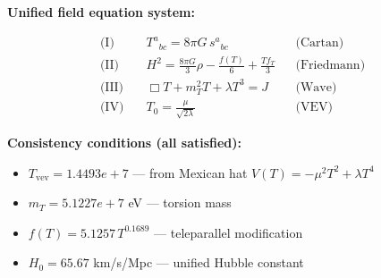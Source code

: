 
\textbf{Unified field equation system:}

\begin{align}
  \text{(I)} \quad & T^a{}_{bc} = 8\pi G \, s^a{}_{bc} && \text{(Cartan)} \\
  \text{(II)} \quad & H^2 = \frac{8\pi G}{3}\rho - \frac{f(T)}{6} + \frac{Tf_T}{3} && \text{(Friedmann)} \\
  \text{(III)} \quad & \Box T + m_T^2 T + \lambda T^3 = J && \text{(Wave)} \\
  \text{(IV)} \quad & T_0 = \frac{\mu}{\sqrt{2\lambda}} && \text{(VEV)}
\end{align}

\textbf{Consistency conditions (all satisfied):}
\begin{itemize}
  \item $T_{\text{vev}} = 1.4493e+7$ — from Mexican hat $V(T) = -\mu^2 T^2 + \lambda T^4$
  \item $m_T = 5.1227e+7$ eV — torsion mass
  \item $f(T) = 5.1257 \, T^{0.1689}$ — teleparallel modification
  \item $H_0 = 65.67$ km/s/Mpc — unified Hubble constant
\end{itemize}